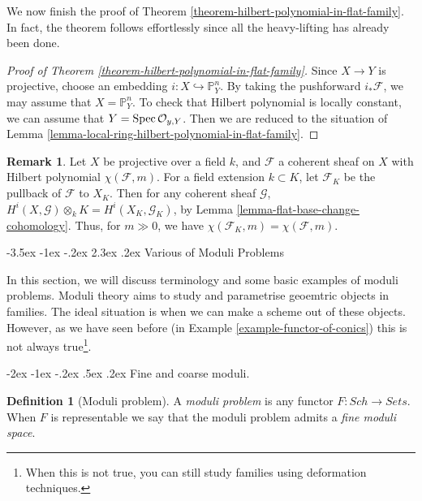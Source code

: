 \documentclass[11pt]{amsart}
\makeatletter
\renewcommand\section{\@startsection {section}{1}{\z@}%
	{-3.5ex \@plus -1ex \@minus -.2ex}%
	{2.3ex \@plus.2ex}%
	{\normalfont\scshape\center}}
\renewcommand\subsection{\@startsection {subsection}{1}{\z@}%
	{-2ex \@plus -1ex \@minus -.2ex}%
	{.5ex \@plus.2ex}%
	{\normalfont\bfseries}}
\newcommand{\Spec}{{\rm Spec \,}}
\newcommand{\sF}{{\mathcal F}}
\newcommand{\sG}{{\mathcal G}}
\newcommand{\sO}{{\mathcal O}}
\renewcommand{\P}{{\mathbb P}}
\theoremstyle{definition}
\newtheorem{definition}[theorem]{Definition}
\newtheorem{remark}[theorem]{Remark}
\makeatother
\begin{document}
We now finish the proof of Theorem \ref{theorem-hilbert-polynomial-in-flat-family}. In fact, the theorem follows effortlessly since all the heavy-lifting has already  been done.

\begin{proof}[Proof of Theorem \ref{theorem-hilbert-polynomial-in-flat-family}]
	Since $X\rightarrow Y$ is projective, choose an embedding $i:X\hookrightarrow \P_Y^n$. By taking the pushforward $i_*\sF$, we may assume that $X=\P_Y^n$. To check that Hilbert polynomial is locally constant, we can assume that $Y=\Spec \sO_{y,Y}$. Then we are reduced to the situation of Lemma \ref{lemma-local-ring-hilbert-polynomial-in-flat-family}.
\end{proof}

\begin{remark}
	\label{remark-hilbert-polynomial-field-extension}
	Let $X$ be projective over a field $k$, and $\sF$ a coherent sheaf on $X$ with Hilbert polynomial $\chi(\sF,m)$. For a field extension $k\subset K$, let $\sF_K$ be the pullback of $\sF$ to $X_K$. Then for any coherent sheaf $\sG$, $H^i(X,\sG) \otimes_k K = H^i(X_K,\sG_K)$, by Lemma \ref{lemma-flat-base-change-cohomology}. Thus, for $m\gg 0$, we have $\chi(\sF_K,m)=\chi(\sF,m)$.
\end{remark}

\section{Various of Moduli Problems}

In this section, we will discuss terminology and some basic examples of moduli problems. Moduli theory aims to study and parametrise geoemtric objects in families. The ideal situation is when we can make a scheme out of these objects. However, as we have seen before (in Example \ref{example-functor-of-conics}) this is not always true\footnote{When this is not true, you can still study families using deformation techniques.}.

\subsection{Fine and coarse moduli.}
\begin{definition}[Moduli problem]
	A \textit{moduli problem} is any functor $F: \mathit{Sch} \rightarrow \mathit{Sets}$. When $F$ is representable we say that the moduli problem admits a \textit{fine moduli space}.
\end{definition}
\end{document}
